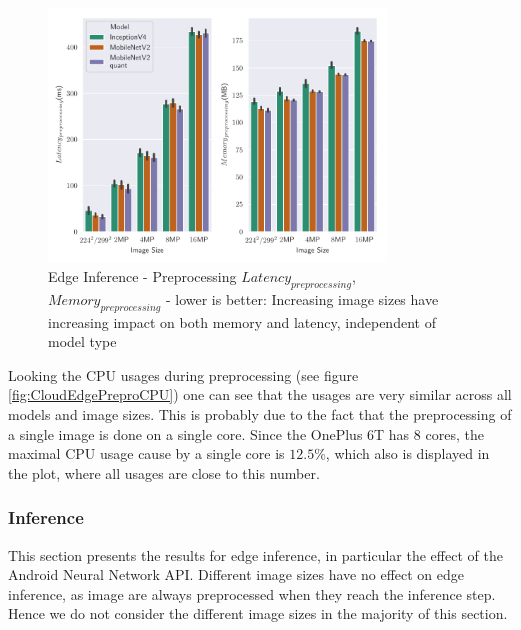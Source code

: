 \begin{figure}[!htb]
\centering
\includegraphics[width=0.8\textwidth]{./Bilder/single_plots/edge_inference_plots/Edge_Inference_Preprocessing.pdf}
\caption[Edge Inference - Preprocessing $Latency_{preprocessing}$, $Memory_{preprocessing}$]{Edge Inference - Preprocessing $Latency_{preprocessing}$, $Memory_{preprocessing}$ -  lower is better: Increasing image sizes have increasing impact on both memory and latency, independent of model type}
\label{fig:EdgePrepro}
\end{figure}
Looking the CPU usages during preprocessing (see figure \ref{fig:CloudEdgePreproCPU}) one can see that the usages are very similar across all models and image sizes. This is probably due to the fact that the preprocessing of a single image is done on a single core. Since the OnePlus 6T has $8$ cores, the maximal CPU usage cause by a single core is $12.5\%$, which also is displayed in the plot, where all usages are close to this number.

\FloatBarrier
\subsubsection{Inference}
This section presents the results for edge inference, in particular the effect of the Android Neural Network API.
Different image sizes have no effect on edge inference, as image are always preprocessed when they reach the inference step.
Hence we do not consider the different image sizes in the majority of this section.


